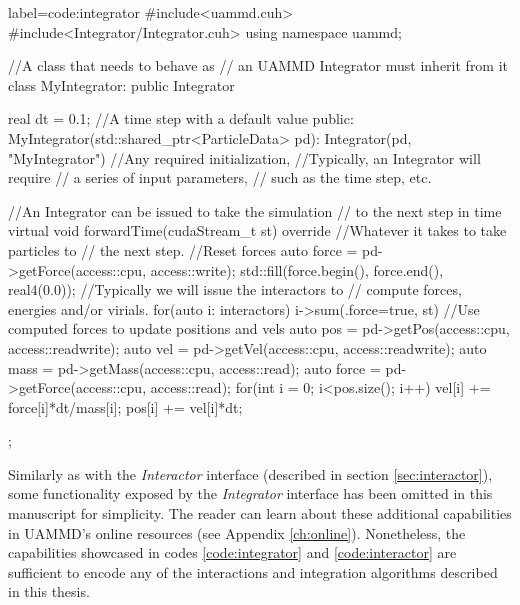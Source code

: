 \documentclass[ twoside,openright,titlepage,numbers=noenddot,%
headinclude,footinclude,cleardoublepage=empty,abstract=on,
BCOR=5mm,paper=a4,fontsize=11pt, dvipsnames
]{scrreprt}
\newcommand{\uammd}{\gls{UAMMD}\xspace}
\begin{document}
\begin{code2}
{label=code:integrator}
#include<uammd.cuh>
#include<Integrator/Integrator.cuh>
using namespace uammd;

//A class that needs to behave as 
// an UAMMD Integrator must inherit from it
class MyIntegrator: public Integrator{
  real dt = 0.1; //A time step with a default value
public:
  MyIntegrator(std::shared_ptr<ParticleData> pd):
          Integrator(pd, "MyIntegrator"){
    //Any required initialization,
    //Typically, an Integrator will require
    // a series of input parameters,
    // such as the time step, etc.
  }

  //An Integrator can be issued to take the simulation
  // to the next step in time
  virtual void forwardTime(cudaStream_t st) override{
   //Whatever it takes to take particles to
   // the next step.
   { //Reset forces
     auto force = pd->getForce(access::cpu, access::write);
     std::fill(force.begin(), force.end(), real4(0.0));
   }
   //Typically we will issue the interactors to 
   // compute forces, energies and/or virials.
   for(auto i: interactors) i->sum({.force=true}, st)
   //Use computed forces to update positions and vels
   auto pos = pd->getPos(access::cpu, access::readwrite);
   auto vel = pd->getVel(access::cpu, access::readwrite);
   auto mass = pd->getMass(access::cpu, access::read);
   auto force = pd->getForce(access::cpu, access::read);
   for(int i = 0; i<pos.size(); i++){
     vel[i] += force[i]*dt/mass[i];
     pos[i] += vel[i]*dt;
   }
  }
};
\end{code2}

Similarly as with the \emph{Interactor} interface (described in section \ref{sec:interactor}), some functionality exposed by the \emph{Integrator} interface has been omitted in this manuscript for simplicity. The reader can learn about these additional capabilities in \uammd's online resources (see Appendix \ref{ch:online}). Nonetheless, the capabilities showcased in codes \ref{code:integrator} and \ref{code:interactor} are sufficient to encode any of the interactions and integration algorithms described in this thesis.
\end{document}

